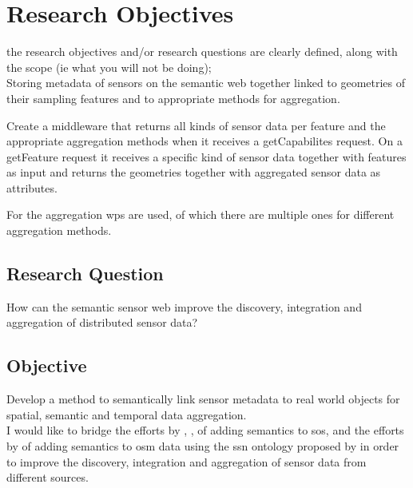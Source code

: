 
\chapter{Research Objectives}
\label{chap:objectives}

the research objectives and/or research questions are clearly defined, along with the scope (ie what you will not be doing);\\

Storing metadata of sensors on the semantic web together linked to geometries of their sampling features and to appropriate methods for aggregation. 

Create a middleware that returns all kinds of sensor data per feature and the appropriate aggregation methods when it receives a getCapabilites request. On a getFeature request it receives a specific kind of sensor data together with  features as input and returns the geometries together with aggregated sensor data as attributes.    

For the aggregation \ac{wps} are used, of which there are multiple ones for different aggregation methods. 

\iffalse

\section{Research Question} 
How can the semantic sensor web improve the discovery, integration and aggregation of distributed sensor data?


\section{Objective} 
Develop a method to semantically link sensor metadata to real world objects for spatial, semantic and temporal data aggregation.\\

I would like to bridge the efforts by \cite{SSW:Henson}, \cite{SSW:Pschorr},  of adding semantics to \ac{sos}, and the efforts by \cite{LD:Auer} of adding semantics to \ac{osm} data using the \ac{ssn} ontology proposed by \cite{SSW:SSN_incubatorGroup} in order to improve the discovery, integration and aggregation of sensor data from different sources.

